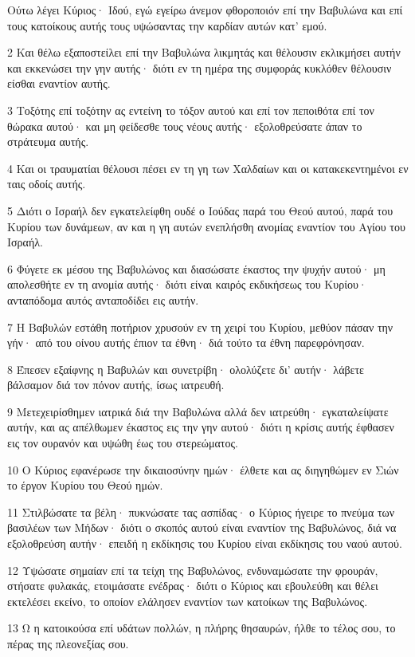 \par Ούτω λέγει Κύριος· Ιδού, εγώ εγείρω άνεμον φθοροποιόν επί την Βαβυλώνα και επί τους κατοίκους αυτής τους υψώσαντας την καρδίαν αυτών κατ' εμού.
\par 2 Και θέλω εξαποστείλει επί την Βαβυλώνα λικμητάς και θέλουσιν εκλικμήσει αυτήν και εκκενώσει την γην αυτής· διότι εν τη ημέρα της συμφοράς κυκλόθεν θέλουσιν είσθαι εναντίον αυτής.
\par 3 Τοξότης επί τοξότην ας εντείνη το τόξον αυτού και επί τον πεποιθότα επί τον θώρακα αυτού· και μη φείδεσθε τους νέους αυτής· εξολοθρεύσατε άπαν το στράτευμα αυτής.
\par 4 Και οι τραυματίαι θέλουσι πέσει εν τη γη των Χαλδαίων και οι κατακεκεντημένοι εν ταις οδοίς αυτής.
\par 5 Διότι ο Ισραήλ δεν εγκατελείφθη ουδέ ο Ιούδας παρά του Θεού αυτού, παρά του Κυρίου των δυνάμεων, αν και η γη αυτών ενεπλήσθη ανομίας εναντίον του Αγίου του Ισραήλ.
\par 6 Φύγετε εκ μέσου της Βαβυλώνος και διασώσατε έκαστος την ψυχήν αυτού· μη απολεσθήτε εν τη ανομία αυτής· διότι είναι καιρός εκδικήσεως του Κυρίου· ανταπόδομα αυτός ανταποδίδει εις αυτήν.
\par 7 Η Βαβυλών εστάθη ποτήριον χρυσούν εν τη χειρί του Κυρίου, μεθύον πάσαν την γήν· από του οίνου αυτής έπιον τα έθνη· διά τούτο τα έθνη παρεφρόνησαν.
\par 8 Έπεσεν εξαίφνης η Βαβυλών και συνετρίβη· ολολύζετε δι' αυτήν· λάβετε βάλσαμον διά τον πόνον αυτής, ίσως ιατρευθή.
\par 9 Μετεχειρίσθημεν ιατρικά διά την Βαβυλώνα αλλά δεν ιατρεύθη· εγκαταλείψατε αυτήν, και ας απέλθωμεν έκαστος εις την γην αυτού· διότι η κρίσις αυτής έφθασεν εις τον ουρανόν και υψώθη έως του στερεώματος.
\par 10 Ο Κύριος εφανέρωσε την δικαιοσύνην ημών· έλθετε και ας διηγηθώμεν εν Σιών το έργον Κυρίου του Θεού ημών.
\par 11 Στιλβώσατε τα βέλη· πυκνώσατε τας ασπίδας· ο Κύριος ήγειρε το πνεύμα των βασιλέων των Μήδων· διότι ο σκοπός αυτού είναι εναντίον της Βαβυλώνος, διά να εξολοθρεύση αυτήν· επειδή η εκδίκησις του Κυρίου είναι εκδίκησις του ναού αυτού.
\par 12 Υψώσατε σημαίαν επί τα τείχη της Βαβυλώνος, ενδυναμώσατε την φρουράν, στήσατε φυλακάς, ετοιμάσατε ενέδρας· διότι ο Κύριος και εβουλεύθη και θέλει εκτελέσει εκείνο, το οποίον ελάλησεν εναντίον των κατοίκων της Βαβυλώνος.
\par 13 Ω η κατοικούσα επί υδάτων πολλών, η πλήρης θησαυρών, ήλθε το τέλος σου, το πέρας της πλεονεξίας σου.
